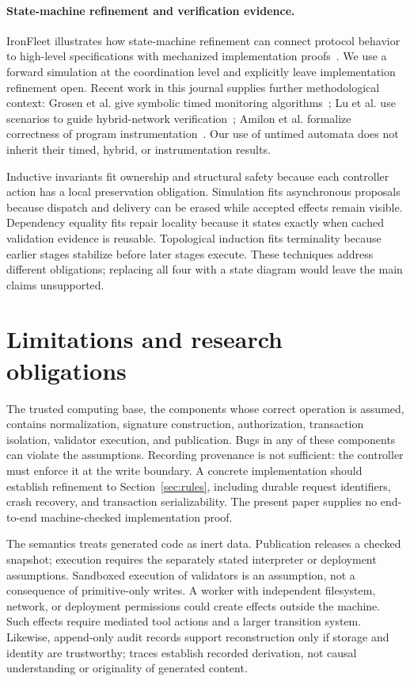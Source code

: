 \documentclass[pdflatex,sn-mathphys-num]{sn-jnl}
\theoremstyle{thmstyleone}
\theoremstyle{thmstylethree}
\theoremstyle{thmstyletwo}
\begin{document}
\paragraph{State-machine refinement and verification evidence.} IronFleet illustrates how state-machine refinement can connect protocol behavior to high-level specifications with mechanized implementation proofs~\cite{ironfleet}. We use a forward simulation at the coordination level and explicitly leave implementation refinement open. Recent work in this journal supplies further methodological context: Grosen et al. give symbolic timed monitoring algorithms~\cite{grosen}; Lu et al. use scenarios to guide hybrid-network verification~\cite{lu}; Amilon et al. formalize correctness of program instrumentation~\cite{amilon}. Our use of untimed automata does not inherit their timed, hybrid, or instrumentation results.

Inductive invariants fit ownership and structural safety because each controller action has a local preservation obligation. Simulation fits asynchronous proposals because dispatch and delivery can be erased while accepted effects remain visible. Dependency equality fits repair locality because it states exactly when cached validation evidence is reusable. Topological induction fits terminality because earlier stages stabilize before later stages execute. These techniques address different obligations; replacing all four with a state diagram would leave the main claims unsupported.

\section{Limitations and research obligations}\label{sec:limitations}
The trusted computing base, the components whose correct operation is assumed, contains normalization, signature construction, authorization, transaction isolation, validator execution, and publication. Bugs in any of these components can violate the assumptions. Recording provenance is not sufficient: the controller must enforce it at the write boundary. A concrete implementation should establish refinement to Section~\ref{sec:rules}, including durable request identifiers, crash recovery, and transaction serializability. The present paper supplies no end-to-end machine-checked implementation proof.

The semantics treats generated code as inert data. Publication releases a checked snapshot; execution requires the separately stated interpreter or deployment assumptions. Sandboxed execution of validators is an assumption, not a consequence of primitive-only writes. A worker with independent filesystem, network, or deployment permissions could create effects outside the machine. Such effects require mediated tool actions and a larger transition system. Likewise, append-only audit records support reconstruction only if storage and identity are trustworthy; traces establish recorded derivation, not causal understanding or originality of generated content.
\end{document}
